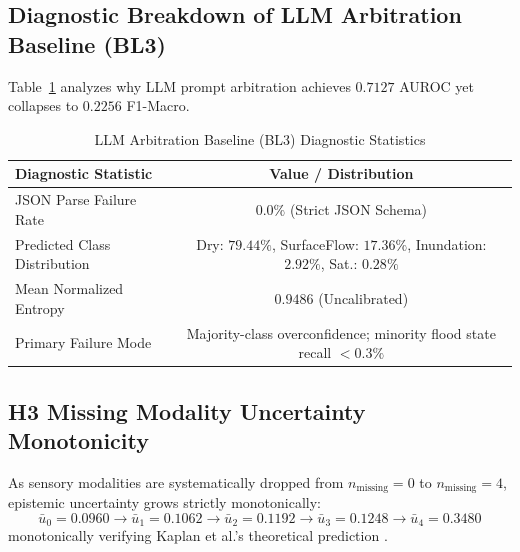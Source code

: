 \subsection{Diagnostic Breakdown of LLM Arbitration Baseline (BL3)}
Table~\ref{tab:bl3_diag} analyzes why LLM prompt arbitration achieves $0.7127$ AUROC yet collapses to $0.2256$ F1-Macro.

\begin{table}[htbp]
\caption{LLM Arbitration Baseline (BL3) Diagnostic Statistics}
\label{tab:bl3_diag}
\centering
\begin{tabular}{lc}
\toprule
\textbf{Diagnostic Statistic} & \textbf{Value / Distribution} \\
\midrule
JSON Parse Failure Rate & $0.0\%$ (Strict JSON Schema) \\
Predicted Class Distribution & Dry: $79.44\%$, SurfaceFlow: $17.36\%$, Inundation: $2.92\%$, Sat.: $0.28\%$ \\
Mean Normalized Entropy & $0.9486$ (Uncalibrated) \\
Primary Failure Mode & Majority-class overconfidence; minority flood state recall $< 0.3\%$ \\
\bottomrule
\end{tabular}
\end{table}

\subsection{H3 Missing Modality Uncertainty Monotonicity}
As sensory modalities are systematically dropped from $n_{\text{missing}} = 0$ to $n_{\text{missing}} = 4$, epistemic uncertainty grows strictly monotonically:
\begin{equation}
\bar{u}_0 = 0.0960 \longrightarrow \bar{u}_1 = 0.1062 \longrightarrow \bar{u}_2 = 0.1192 \longrightarrow \bar{u}_3 = 0.1248 \longrightarrow \bar{u}_4 = 0.3480
\end{equation}
monotonically verifying Kaplan et al.'s theoretical prediction \cite{kaplan2015subjective}.
